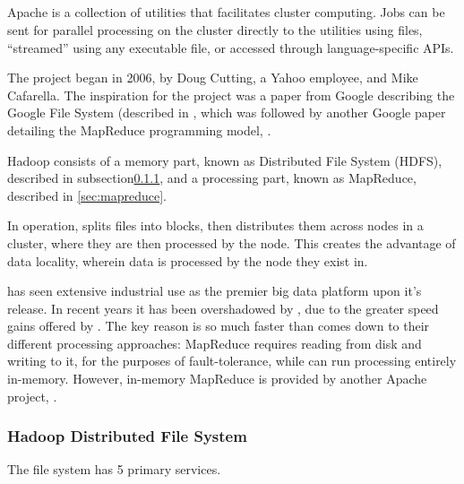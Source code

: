 \subsection{}\label{sec:hadoop-1}

Apache  is a collection of utilities that facilitates cluster
computing. Jobs can be sent for parallel processing on the cluster
directly to the utilities using  files, ``streamed'' using any
executable file, or accessed through language-specific APIs.

The project began in 2006, by Doug Cutting, a Yahoo employee, and Mike
Cafarella. The inspiration for the project was a paper from Google
describing the Google File System (described in
\textcite{ghemawat2003google}, which was followed by another Google paper
detailing the MapReduce programming model, \textcite{dean2004mapreduce}.

Hadoop consists of a memory part, known as  Distributed File
System (HDFS), described in subsection\cref{sec:hdfs},
and a processing part, known as MapReduce, described in
\cref{sec:mapreduce}.

In operation,  splits files into blocks, then distributes them
across nodes in a cluster, where they are then processed by the node.
This creates the advantage of data locality, wherein data is processed
by the node they exist in.

 has seen extensive industrial use as the premier big data
platform upon it's release. In recent years it has been overshadowed by
, due to the greater speed gains offered by . The key reason
 is so much faster than  comes down to their different
processing approaches:  MapReduce requires reading from disk and
writing to it, for the purposes of fault-tolerance, while  can run
processing entirely in-memory. However, in-memory MapReduce is provided
by another Apache project, \cite{zheludkov2017high}.

\subsubsection{Hadoop Distributed File System}\label{sec:hdfs}

The file system has 5 primary services.

